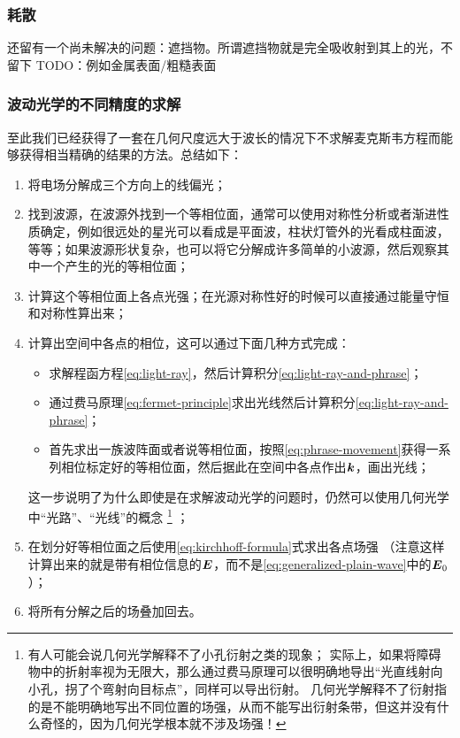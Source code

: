 \subsubsection{耗散}

还留有一个尚未解决的问题：遮挡物。所谓遮挡物就是完全吸收射到其上的光，不留下
TODO：例如金属表面/粗糙表面

\subsubsection{波动光学的不同精度的求解}

至此我们已经获得了一套在几何尺度远大于波长的情况下不求解麦克斯韦方程而能够获得相当精确的结果的方法。总结如下：
\begin{enumerate}
    \item 将电场分解成三个方向上的线偏光；
    \item 找到波源，在波源外找到一个等相位面，通常可以使用对称性分析或者渐进性质确定，例如很远处的星光可以看成是平面波，柱状灯管外的光看成柱面波，等等；如果波源形状复杂，也可以将它分解成许多简单的小波源，然后观察其中一个产生的光的等相位面；
    \item 计算这个等相位面上各点光强；在光源对称性好的时候可以直接通过能量守恒和对称性算出来；
    \item 计算出空间中各点的相位，这可以通过下面几种方式完成：
    \begin{itemize}
        \item 求解程函方程\eqref{eq:light-ray}，然后计算积分\eqref{eq:light-ray-and-phrase}；
        \item 通过费马原理\eqref{eq:fermet-principle}求出光线然后计算积分\eqref{eq:light-ray-and-phrase}；
        \item 首先求出一族波阵面或者说等相位面，按照\eqref{eq:phrase-movement}获得一系列相位标定好的等相位面，然后据此在空间中各点作出$\vb*{k}$，画出光线；
    \end{itemize}
    这一步说明了为什么即使是在求解波动光学的问题时，仍然可以使用几何光学中“光路”、“光线”的概念%
    \footnote{有人可能会说几何光学解释不了小孔衍射之类的现象；
    实际上，如果将障碍物中的折射率视为无限大，那么通过费马原理可以很明确地导出“光直线射向小孔，拐了个弯射向目标点”，同样可以导出衍射。
    几何光学解释不了衍射指的是不能明确地写出不同位置的场强，从而不能写出衍射条带，但这并没有什么奇怪的，因为几何光学根本就不涉及场强！}
    ；
    \item 在划分好等相位面之后使用\eqref{eq:kirchhoff-formula}式求出各点场强
    （注意这样计算出来的就是带有相位信息的$\vb*{E}$，而不是\eqref{eq:generalized-plain-wave}中的$\vb*{E}_0$）；
    \item 将所有分解之后的场叠加回去。
\end{enumerate}

